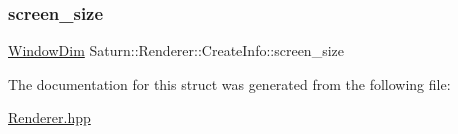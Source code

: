 \subsubsection{\texorpdfstring{screen\+\_\+size}{screen\_size}}
{\footnotesize\ttfamily \mbox{\hyperlink{namespace_saturn_a606451fdad804aef3b4f56f6805900f2}{Window\+Dim}} Saturn\+::\+Renderer\+::\+Create\+Info\+::screen\+\_\+size}



The documentation for this struct was generated from the following file\+:\begin{DoxyCompactItemize}
\item 
\mbox{\hyperlink{_renderer_8hpp}{Renderer.\+hpp}}\end{DoxyCompactItemize}
